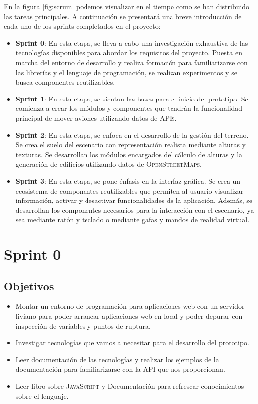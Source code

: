 \documentclass[a4paper, 11pt]{book}
\begin{document}
En la figura \ref{fig:scrum} podemos visualizar en el tiempo como se han distribuido las tareas principales. A continuación se presentará una breve introducción de cada uno de los sprints completados en el proyecto:

\begin{itemize}
    \item \textbf{Sprint 0}: En esta etapa, se lleva a cabo una investigación exhaustiva de las tecnologías disponibles para abordar los requisitos del proyecto. Puesta en marcha del entorno de desarrollo y realiza formación para familiarizarse con las librerías y el lenguaje de programación, se realizan experimentos y se busca componentes reutilizables.
    \item \textbf{Sprint 1}: En esta etapa, se sientan las bases para el inicio del prototipo. Se comienza a crear los módulos y componentes que tendrán la funcionalidad principal de mover aviones utilizando datos de \textsc{APIs}.
    \item \textbf{Sprint 2}: En esta etapa, se enfoca en el desarrollo de la gestión del terreno. Se crea el suelo del escenario con representación realista mediante alturas y texturas. Se desarrollan los módulos encargados del cálculo de alturas y la generación de edificios utilizando datos de \textsc{OpenStreetMaps}.
    \item \textbf{Sprint 3}: En esta etapa, se pone énfasis en la interfaz gráfica. Se crea un ecosistema de componentes reutilizables que permiten al usuario visualizar información, activar y desactivar funcionalidades de la aplicación. Además, se desarrollan los componentes necesarios para la interacción con el escenario, ya sea mediante ratón y teclado o mediante gafas y mandos de realidad virtual.
\end{itemize}

\section{Sprint 0}
\subsection{Objetivos}
\begin{itemize}
    \item Montar un entorno de programación para aplicaciones web con un servidor liviano para poder arrancar aplicaciones web en local y poder depurar con inspección de variables y puntos de ruptura.
    \item Investigar tecnologías que vamos a necesitar para el desarrollo del prototipo.
    \item Leer documentación de las tecnologías y realizar los ejemplos de la documentación para familiarizarse con la \textsc{API} que nos proporcionan.
    \item Leer libro sobre \textsc{JavaScript} y Documentación para refrescar conocimientos sobre el lenguaje.
\end{itemize}
\end{document}

